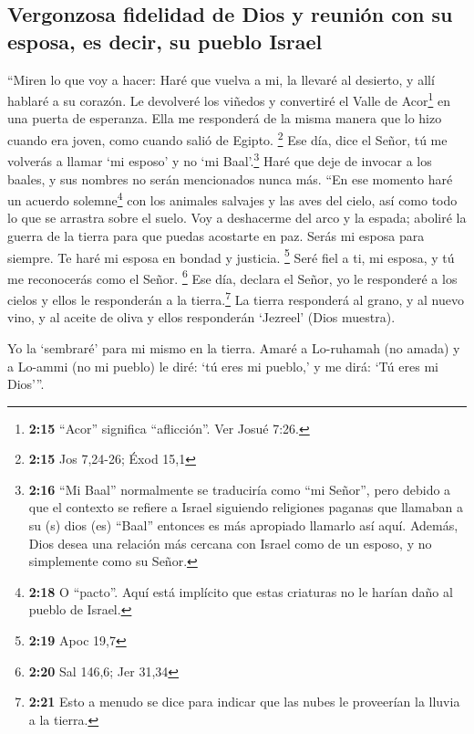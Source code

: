 \hypertarget{vergonzosa-fidelidad-de-dios-y-reuniuxf3n-con-su-esposa-es-decir-su-pueblo-israel}{%
\subsection{Vergonzosa fidelidad de Dios y reunión con su esposa, es
decir, su pueblo
Israel}\label{vergonzosa-fidelidad-de-dios-y-reuniuxf3n-con-su-esposa-es-decir-su-pueblo-israel}}

 ``Miren lo que voy a hacer: Haré que vuelva a mi, la
llevaré al desierto, y allí hablaré a su corazón.  Le
devolveré los viñedos y convertiré el Valle de Acor\footnote{\textbf{2:15}
  ``Acor'' significa ``aflicción''. Ver Josué 7:26.} en una puerta de
esperanza. Ella me responderá de la misma manera que lo hizo cuando era
joven, como cuando salió de Egipto. \footnote{\textbf{2:15} Jos 7,24-26;
  Éxod 15,1}  Ese día, dice el Señor, tú me volverás a
llamar `mi esposo' y no `mi Baal'.\footnote{\textbf{2:16} ``Mi Baal''
  normalmente se traduciría como ``mi Señor'', pero debido a que el
  contexto se refiere a Israel siguiendo religiones paganas que llamaban
  a su (s) dios (es) ``Baal'' entonces es más apropiado llamarlo así
  aquí. Además, Dios desea una relación más cercana con Israel como de
  un esposo, y no simplemente como su Señor.}  Haré que
deje de invocar a los baales, y sus nombres no serán mencionados nunca
más.  ``En ese momento haré un acuerdo solemne\footnote{\textbf{2:18}
  O ``pacto''. Aquí está implícito que estas criaturas no le harían daño
  al pueblo de Israel.} con los animales salvajes y las aves del cielo,
así como todo lo que se arrastra sobre el suelo. Voy a deshacerme del
arco y la espada; aboliré la guerra de la tierra para que puedas
acostarte en paz.  Serás mi esposa para siempre. Te haré
mi esposa en bondad y justicia. \footnote{\textbf{2:19} Apoc 19,7}
 Seré fiel a ti, mi esposa, y tú me reconocerás como el
Señor. \footnote{\textbf{2:20} Sal 146,6; Jer 31,34}  Ese
día, declara el Señor, yo le responderé a los cielos y ellos le
responderán a la tierra.\footnote{\textbf{2:21} Esto a menudo se dice
  para indicar que las nubes le proveerían la lluvia a la tierra.}
 La tierra responderá al grano, y al nuevo vino, y al
aceite de oliva y ellos responderán `Jezreel' (Dios muestra).

 Yo la `sembraré' para mi mismo en la tierra. Amaré a
Lo-ruhamah (no amada) y a Lo-ammi (no mi pueblo) le diré: `tú eres mi
pueblo,' y me dirá: `Tú eres mi Dios'''.

